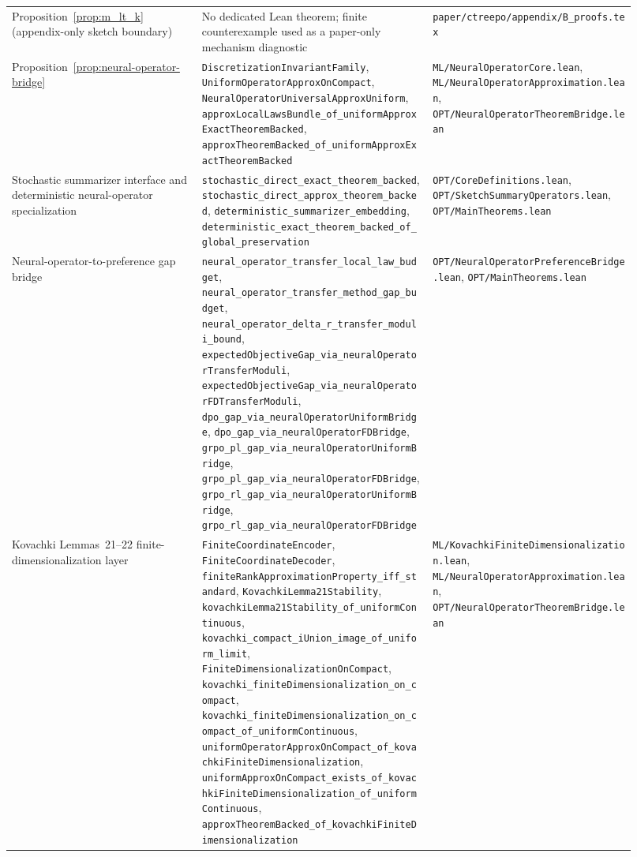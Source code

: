 \begin{table}[h]
\begin{tabular}{p{0.28\linewidth}p{0.34\linewidth}p{0.30\linewidth}}
Proposition~\ref{prop:m_lt_k} (appendix-only sketch boundary) &
No dedicated Lean theorem; finite counterexample used as a paper-only mechanism diagnostic &
\texttt{paper/ctreepo/appendix/B\_proofs.tex} \\

Proposition~\ref{prop:neural-operator-bridge} &
\texttt{DiscretizationInvariantFamily}, \texttt{UniformOperatorApproxOnCompact}, \texttt{NeuralOperatorUniversalApproxUniform}, \texttt{approxLocalLawsBundle\_of\_uniformApproxExactTheoremBacked}, \texttt{approxTheoremBacked\_of\_uniformApproxExactTheoremBacked} &
\texttt{ML/NeuralOperatorCore.lean}, \texttt{ML/NeuralOperatorApproximation.lean}, \texttt{OPT/NeuralOperatorTheoremBridge.lean} \\

Stochastic summarizer interface and deterministic neural-operator specialization &
\texttt{stochastic\_direct\_exact\_theorem\_backed}, \texttt{stochastic\_direct\_approx\_theorem\_backed}, \texttt{deterministic\_summarizer\_embedding}, \texttt{deterministic\_exact\_theorem\_backed\_of\_global\_preservation} &
\texttt{OPT/CoreDefinitions.lean}, \texttt{OPT/SketchSummaryOperators.lean}, \texttt{OPT/MainTheorems.lean} \\

Neural-operator-to-preference gap bridge &
\texttt{neural\_operator\_transfer\_local\_law\_budget}, \texttt{neural\_operator\_transfer\_method\_gap\_budget}, \texttt{neural\_operator\_delta\_r\_transfer\_moduli\_bound}, \texttt{expectedObjectiveGap\_via\_neuralOperatorTransferModuli}, \texttt{expectedObjectiveGap\_via\_neuralOperatorFDTransferModuli}, \texttt{dpo\_gap\_via\_neuralOperatorUniformBridge}, \texttt{dpo\_gap\_via\_neuralOperatorFDBridge}, \texttt{grpo\_pl\_gap\_via\_neuralOperatorUniformBridge}, \texttt{grpo\_pl\_gap\_via\_neuralOperatorFDBridge}, \texttt{grpo\_rl\_gap\_via\_neuralOperatorUniformBridge}, \texttt{grpo\_rl\_gap\_via\_neuralOperatorFDBridge} &
\texttt{OPT/NeuralOperatorPreferenceBridge.lean}, \texttt{OPT/MainTheorems.lean} \\

Kovachki Lemmas~21--22 finite-dimensionalization layer &
\texttt{FiniteCoordinateEncoder}, \texttt{FiniteCoordinateDecoder}, \texttt{finiteRankApproximationProperty\_iff\_standard}, \texttt{KovachkiLemma21Stability}, \texttt{kovachkiLemma21Stability\_of\_uniformContinuous}, \texttt{kovachki\_compact\_iUnion\_image\_of\_uniform\_limit}, \texttt{FiniteDimensionalizationOnCompact}, \texttt{kovachki\_finiteDimensionalization\_on\_compact}, \texttt{kovachki\_finiteDimensionalization\_on\_compact\_of\_uniformContinuous}, \texttt{uniformOperatorApproxOnCompact\_of\_kovachkiFiniteDimensionalization}, \texttt{uniformApproxOnCompact\_exists\_of\_kovachkiFiniteDimensionalization\_of\_uniformContinuous}, \texttt{approxTheoremBacked\_of\_kovachkiFiniteDimensionalization} &
\texttt{ML/KovachkiFiniteDimensionalization.lean}, \texttt{ML/NeuralOperatorApproximation.lean}, \texttt{OPT/NeuralOperatorTheoremBridge.lean} \\


\end{tabular}
\end{table}
